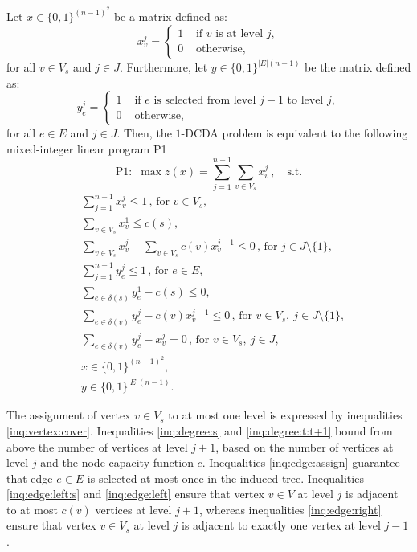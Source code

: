 Let $x \in \{0,1\}^{(n-1)^2}$ be a matrix defined as:
\begin{equation*}
x^j_v = \left\{
\begin{array}{ll}
1 & \textrm{ if } v \textrm{ is at level } j,\\
0 & \textrm{ otherwise,}
\end{array}
\right.
\end{equation*}
for all $v \in V_s$ and $j \in J$.  Furthermore, let $y \in
\{0,1\}^{|E|(n-1)}$ be the matrix defined as:
\begin{equation*}
y^j_e = \left\{
\begin{array}{ll}
1 & \textrm{ if } e \textrm{ is selected from level } j-1 \textrm{ to level } j,\\
0 & \textrm{ otherwise,}
\end{array}
\right.
\end{equation*}
for all $e \in E$ and $j \in J$.  Then, the $1$-DCDA problem is equivalent to
the following mixed-integer linear program P1
\[\text{P1} : \, \, \max z(x) = \sum\limits_{j=1}^{n-1} \sum\limits_{v \in V_s} x_v^j \, , \quad \text{s.t.} \]
\vspace{-0.25cm}
\begin{align}
\label{inq:vertex:cover} & \sum\limits_{j=1}^{n-1} x_v^j \leq 1 \, , \, \textrm{for } v \in V_s,\\
\label{inq:degree:s} & \sum\limits_{v \in V_s} x^1_v \leq c(s),\\
\label{inq:degree:t:t+1} & \sum\limits_{v \in V_s} x_v^j - \sum\limits_{v \in V_s} c(v)x_v^{j-1} \leq 0 \, , \, \textrm{for } j \in J\setminus\{1\},\\
\label{inq:edge:assign} & \sum\limits_{j=1}^{n-1} y_e^j \leq 1 \, , \,  \textrm{for } e \in E,\\
\label{inq:edge:left:s} & \sum\limits_{e \in \delta(s)} y_e^1 - c(s) \leq 0,\\
\label{inq:edge:left} & \sum\limits_{e \in \delta(v)} y_e^j - c(v)x_v^{j-1} \leq 0 \, , \, \textrm{for } v \in V_s,\ j \in J\setminus\{1\},\\
\label{inq:edge:right} & \sum\limits_{e \in \delta(v)} y_e^j - x_v^j = 0 \, , \, \textrm{for } v \in V_s,\ j \in J, \\
\label{inq:vertex:integral} & x \in \{0,1\}^{(n-1)^2},\\
\label{inq:edge:integral} & y \in \{0,1\}^{|E|(n-1)}.
\end{align}

The assignment of vertex $v \in V_s$ to at most one level is expressed
by inequalities \eqref{inq:vertex:cover}. Inequalities
\eqref{inq:degree:s} and \eqref{inq:degree:t:t+1} bound from above the
number of vertices at level $j+1$, based on the number of vertices at
level $j$ and the node capacity function $c$.  Inequalities
\eqref{inq:edge:assign} guarantee that edge $e \in E$ is selected at
most once in the induced tree.  Inequalities \eqref{inq:edge:left:s}
and \eqref{inq:edge:left} ensure that vertex $v \in V$ at level $j$ is
adjacent to at most $c(v)$ vertices at level $j+1$, whereas
inequalities \eqref{inq:edge:right} ensure that vertex $v \in V_s$ at
level $j$ is adjacent to exactly one vertex at level $j-1$.

